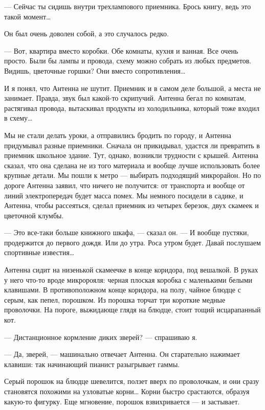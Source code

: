 — Сейчас ты сидишь внутри  трехлампового приемника. Брось книгу, ведь  это
такой момент…

Он был очень доволен собой, а это случалось редко.

— Вот, квартира  вместо коробки. Обе  комнаты, кухня и  ванная. Все  очень
просто. Были бы лампы и провода,  схему можно собрать из любых  предметов.
Видишь, цветочные горшки? Они вместо сопротивления…

И я понял, что Антенна не шутит. Приемник и в самом деле большой, а  места
не занимает.  Правда,  звук  был  какой-то  скрипучий.  Антенна  бегал  по
комнатам, растягивал провода, вытаскивал продукты из холодильника, который
тоже входил в схему…

Мы не  стали делать  уроки, а  отправились бродить  по городу,  и  Антенна
придумывал разные приемники. Сначала он прикидывал, удастся ли  превратить
в приемник  школьное здание.  Тут, однако,  возникли трудности  с  крышей.
Антенна сказал,  что она  сделана  не из  того  материала и  вообще  лучше
использовать более крупные детали. Мы пошли к метро — выбирать  подходящий
микрорайон. Но  по дороге  Антенна  заявил, что  ничего не  получится:  от
транспорта и вообще от линий электропередач будет масса помех. Мы  немного
посидели в садике, и Антенна, чтобы рассеяться, сделал приемник из четырех
березок, двух скамеек и цветочной клумбы.

— Это все-таки  больше книжного шкафа,  — сказал он.  — И вообще  пустяки,
продержится до  первого  дождя.  Или  до утра.  Роса  утром  будет.  Давай
послушаем спортивные известия…

Антенна сидит на  низенькой скамеечке  в конце коридора,  под вешалкой.  В
руках у него что-то вроде микророяля: черная плоская коробка с  маленькими
белыми клавишами. В противоположном конце коридора, на полу, чайное блюдце
с серым,  как  пепел, порошком.  Из  порошка торчат  три  короткие  медные
проволочки. На пороге, выжидающе глядя на блюдце, стоит тощий исцарапанный
кот.

— Дистанционное кормление диких зверей? — спрашиваю я.

— Да,  зверей,  — машинально  отвечает  Антенна. Он  старательно  нажимает
клавиши: так начинающий пианист разыгрывает гаммы.

Серый порошок  на блюдце  шевелится, ползет  вверх по  проволочкам, и  они
сразу становятся  похожими на  узловатые корни…  Корни быстро  срастаются,
образуя  какую-то  фигурку.  Еще  мгновение,  порошок  взвихривается  —  и
застывает.

